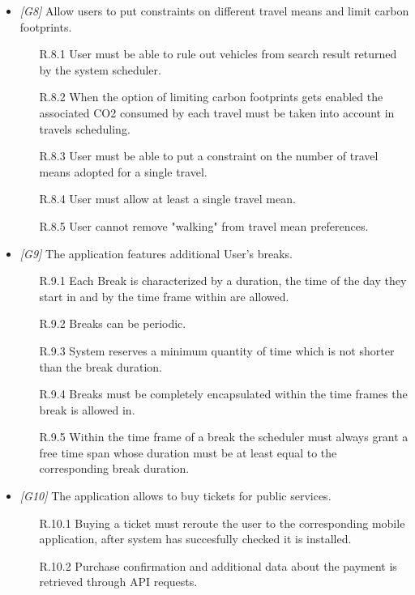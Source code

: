 \begin{itemize}
	\item \textit{[G8]} Allow users to put constraints on different travel means and limit carbon footprints.
		\begin{itemize}
			\item[R.8.1] User must be able to rule out vehicles from search result returned by the system scheduler.
			\item[R.8.2] When the option of limiting carbon footprints gets enabled the associated CO2 consumed by each travel must be taken into account in travels scheduling.
			\item[R.8.3] User must be able to put a constraint on the number of travel means adopted for a single travel.			\item[R.8.4] User must allow at least a single travel mean.
			\item[R.8.5] User cannot remove "walking" from travel mean preferences.
		\end{itemize}


	\item \textit{[G9]} The application features additional User’s breaks.
		\begin{itemize}
			\item [R.9.1] Each Break is characterized by a duration, the time of the day they start in and by the time frame within are allowed.
			\item[R.9.2] Breaks can be periodic.
			\item[R.9.3] System reserves a minimum quantity of time which is not shorter than the break duration.
			\item[R.9.4] Breaks must be completely encapsulated within the time frames the break is allowed in.
			\item[R.9.5] Within the time frame of a break the scheduler must always grant a free time span whose duration must be at least equal to the corresponding break duration.
		\end{itemize}
			


	\item \textit{[G10]} The application allows to buy tickets for public services.
		\begin{itemize}
			\item[R.10.1] Buying a ticket must reroute the user to the corresponding mobile application, after system has succesfully checked it is installed.			
			\item[R.10.2] Purchase confirmation and additional data about the payment is retrieved through API requests.
			

\end{itemize}
\end{itemize}
